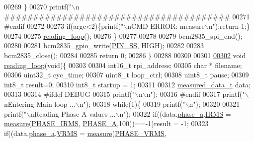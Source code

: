 \begin{DoxyCode}
{{{{{00269         \}   
00270         printf(\textcolor{stringliteral}{"\(\backslash\)n
      #######################################%
00271 \textcolor{preprocessor}{        #endif}
00272 \textcolor{preprocessor}{}        
00273         \textcolor{keywordflow}{if}(argc<2)\{printf(\textcolor{stringliteral}{"\(\backslash\)nCMD ERROR: measure\(\backslash\)n"});\textcolor{keywordflow}{return}-1;\} 
00274            
00275            \hyperlink{a00003_gaeb3af492d3421787fcbb2cd1bbbaf62c}{reading\_loop}();
00276      \}
00277 
00278      
00279      bcm2835\_spi\_end();
00280        
00281      bcm2835\_gpio\_write(\hyperlink{a00039_ab4b553591a495409d4f7cec4b6c3e754}{PIN\_SS}, HIGH);
00282        
00283      bcm2835\_close();
00284      
00285 \textcolor{keywordflow}{return} 0;
00286 \}
00288 
00300 
00301 
\hypertarget{a00035_source_l00302}{}\hyperlink{a00003_gaeb3af492d3421787fcbb2cd1bbbaf62c}{00302} \textcolor{keywordtype}{void} \hyperlink{a00003_gaeb3af492d3421787fcbb2cd1bbbaf62c}{reading\_loop}(\textcolor{keywordtype}{void})\{
00303 
00304   int16\_t   rpi\_address; 
00305   \textcolor{keywordtype}{char} *    filename;
00306   uint32\_t  cyc\_time;
00307   uint8\_t   loop\_ctrl;
00308   uint8\_t   pause;
00309   int8\_t    result=0;
00310   int8\_t startup = 1;
00311   
00312     \hyperlink{a00029}{measured\_data\_t} data;
00313     
00314 \textcolor{preprocessor}{        #ifdef DEBUG }
00315 \textcolor{preprocessor}{}        printf(\textcolor{stringliteral}{"\(\backslash\)n\(\backslash\)n"});
00316 \textcolor{preprocessor}{        #endif  }
00317 \textcolor{preprocessor}{}         printf(\textcolor{stringliteral}{"\(\backslash\)nEntering Main loop ...\(\backslash\)n"});
00318          \textcolor{keywordflow}{while}(1)\{  
00319          printf(\textcolor{stringliteral}{"\(\backslash\)n"});
00320          
00321          printf(\textcolor{stringliteral}{"\(\backslash\)nReading Phase A values ...\(\backslash\)n"});   
00322          \textcolor{keywordflow}{if}((data.\hyperlink{a00029_ad7205e9853a503d2fab0697f5a301f6c}{phase\_a}.\hyperlink{a00030_a4f87f30b543e89e2e5dfa1b8f3f58eff}{IRMS}           = \hyperlink{a00009_gac914ebaa64afce03ee852af09659cf69}{measure}(\hyperlink{a00043_a15c9ccf287820001431c33c4bb25a23b}{PHASE\_IRMS},
      \hyperlink{a00043_ad214039f52b011ce2bd6c85ff98a981b}{PHASE\_A},100))==-1)result = -1;
00323          \textcolor{keywordflow}{if}((data.\hyperlink{a00029_ad7205e9853a503d2fab0697f5a301f6c}{phase\_a}.\hyperlink{a00030_a08415029e214174a01bc6487ff98ee9b}{VRMS}           = \hyperlink{a00009_gac914ebaa64afce03ee852af09659cf69}{measure}(\hyperlink{a00043_af0c09c5a455410e6fbd35fd55221338f}{PHASE\_VRMS},
}}}}}}
\end{DoxyCode}
